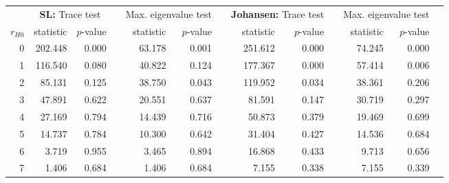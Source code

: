 \begin{tabular}{rrrrrrrrrrrrr}
	\hline \hline
	  & \multicolumn{2}{c}{ \textbf{SL:} Trace test } &   & \multicolumn{2}{c}{ Max. eigenvalue test } &   & \multicolumn{2}{c}{ \textbf{Johansen:} Trace test } &   & \multicolumn{2}{c}{ Max. eigenvalue test } &   \\
	\cline{2-3} \cline{5-6}\cline{8-9} \cline{11-12}
	$ r_{H0} $ & statistic & $ p $-value &   & statistic & $ p $-value &   & statistic & $ p $-value &   & statistic & $ p $-value &   \\
	\hline
	0 & 202.448 &   0.000 &   & 63.178 &  0.001 &   & 251.612 &   0.000 &   & 74.245 &  0.000 &   \\
	1 & 116.540 &   0.080 &   & 40.822 &  0.124 &   & 177.367 &   0.000 &   & 57.414 &  0.006 &   \\
	2 &  85.131 &   0.125 &   & 38.750 &  0.043 &   & 119.952 &   0.034 &   & 38.361 &  0.206 &   \\
	3 &  47.891 &   0.622 &   & 20.551 &  0.637 &   &  81.591 &   0.147 &   & 30.719 &  0.297 &   \\
	4 &  27.169 &   0.794 &   & 14.439 &  0.716 &   &  50.873 &   0.379 &   & 19.469 &  0.699 &   \\
	5 &  14.737 &   0.784 &   & 10.300 &  0.642 &   &  31.404 &   0.427 &   & 14.536 &  0.684 &   \\
	6 &   3.719 &   0.955 &   &  3.465 &  0.894 &   &  16.868 &   0.433 &   &  9.713 &  0.656 &   \\
	7 &   1.406 &   0.684 &   &  1.406 &  0.684 &   &   7.155 &   0.338 &   &  7.155 &  0.339 &   \\
	\hline \hline
\end{tabular}
